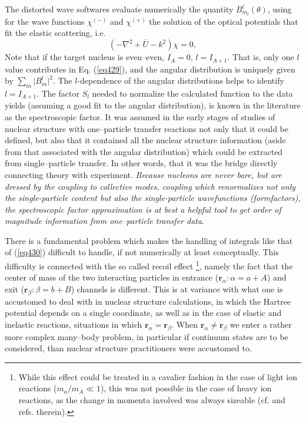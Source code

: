 The distorted wave softwares evaluate numerically  the quantity $B_{m_l}^l(\theta)$, using for the wave functions $\chi^{(-)}$ and $\chi^{(+)}$ the solution of the optical potentials that fit the elastic scattering, i.e.
\begin{equation}\label{eq435}
(-\nabla ^2+\bar U-k^2) \chi=0,
\end{equation}
Note that if the target nucleus is even--even, $I_A=0$,  $l=I_{A+1}$. That is, only one $l$ value contributes in Eq. (\ref{eq429}), and the angular distribution is uniquely given by $\sum_{m} \vert B_{m}^l\vert^2$. The $l$-dependence of the angular distributions helps to identify $l=I_{A+1}$. The factor $S_l$ needed to normalize the calculated function to the data yields (assuming a good fit to the angular distribution), is known in the literature as the spectroscopic factor. It was assumed in the early stages of studies of nuclear structure with one--particle transfer reactions not only that it could be defined, but also that it contained all the nuclear structure information (aside from that associated with the angular distribution) which could be extracted from single--particle transfer. In other words, that it was the bridge directly connecting theory with experiment. \emph{Because nucleons are never bare, but are dressed by the coupling to collective modes, coupling which renormalizes not only the single-particle content but also the single-particle wavefunctions (formfactors),   the spectroscopic factor approximation is at best a helpful tool to get order of magnitude information from one--particle transfer data}.



There is a fundamental problem which makes the handling of integrals like that of (\ref{eq430}) difficult to handle, if not numerically at least conceptually. This difficulty is connected with the so called recoil effect \footnote{While this effect could be treated in a cavalier fashion in the case of light ion reactions ($m_a/m_A\ll 1$), this was not possible in the case of heavy ion reactions, as the change in momenta involved was always sizeable (cf. \citet{Broglia:04a} and refs. therein).}, namely the fact that the center of mass of the two interacting particles in entrance ($\mathbf r_{\alpha}: \alpha=a+A$) and exit  ($\mathbf r_{\beta}: \beta=b+B$) channels is different. This is at variance with what one is accustomed to deal with in nuclear structure calculations, in which the Hartree potential depends on a single coordinate, as well as in the case of elastic and inelastic reactions, situations in which $\mathbf r_{\alpha}=\mathbf r_{\beta}$. When $\mathbf r_{\alpha}\neq\mathbf r_{\beta}$ we enter a rather more complex many--body problem, in particular if continuum states are to be considered, than nuclear structure practitioners were accustomed to.
 
